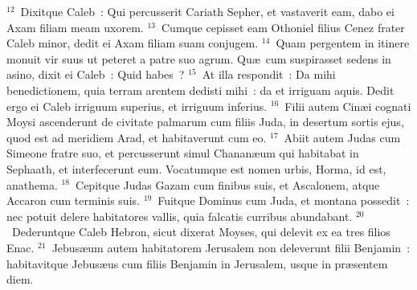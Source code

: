 ${}^{12}$~Dixitque Caleb~: Qui percusserit Cariath Sepher, et vastaverit eam, dabo ei Axam filiam meam uxorem.
${}^{13}$~Cumque cepisset eam Othoniel filius Cenez frater Caleb minor, dedit ei Axam filiam suam conjugem.
${}^{14}$~Quam pergentem in itinere monuit vir suus ut peteret a patre suo agrum. Qu\ae\ cum suspirasset sedens in asino, dixit ei Caleb~: Quid habes~?
${}^{15}$~At illa respondit~: Da mihi benedictionem, quia terram arentem dedisti mihi~: da et irriguam aquis. Dedit ergo ei Caleb irriguum superius, et irriguum inferius.
${}^{16}$~Filii autem Cin\ae i cognati Moysi ascenderunt de civitate palmarum cum filiis Juda, in desertum sortis ejus, quod est ad meridiem Arad, et habitaverunt cum eo.
${}^{17}$~Abiit autem Judas cum Simeone fratre suo, et percusserunt simul Chanan\ae um qui habitabat in Sephaath, et interfecerunt eum. Vocatumque est nomen urbis, Horma, id est, anathema.
${}^{18}$~Cepitque Judas Gazam cum finibus suis, et Ascalonem, atque Accaron cum terminis suis.
${}^{19}$~Fuitque Dominus cum Juda, et montana possedit~: nec potuit delere habitatores vallis, quia falcatis curribus abundabant.
${}^{20}$~Dederuntque Caleb Hebron, sicut dixerat Moyses, qui delevit ex ea tres filios Enac.
${}^{21}$~Jebus\ae um autem habitatorem Jerusalem non deleverunt filii Benjamin~: habitavitque Jebus\ae us cum filiis Benjamin in Jerusalem, usque in pr\ae sentem diem.


